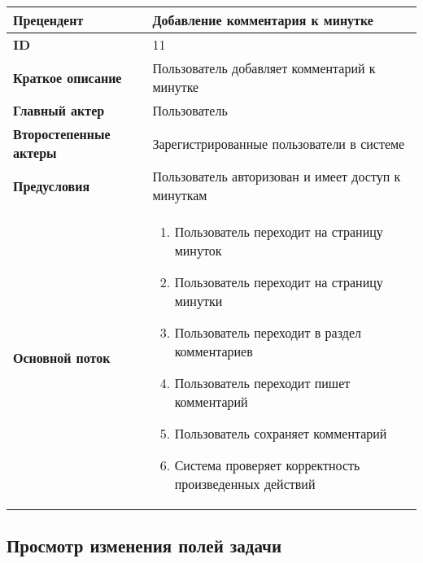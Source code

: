 \documentclass[14pt,a4paper]{extarticle}
\begin{document}
\begin{tabular}{|l|p{9cm}|}
	\hline
	\textbf{Прецендент}            & Добавление комментария к минутке                           \\
	\hline
	\textbf{ID}                    & 11                                                         \\
	\hline
	\textbf{Краткое описание}      & Пользователь добавляет комментарий к минутке               \\
	\hline
	\textbf{Главный актер}         & Пользователь                                               \\
	\hline
	\textbf{Второстепенные актеры} & Зарегистрированные пользователи в системе                  \\
	\hline
	\textbf{Предусловия}           & Пользователь авторизован и имеет доступ к минуткам         \\
	\hline
	\textbf{Основной поток}        & \begin{enumerate}
		                                 \item Пользователь переходит на страницу минуток
		                                 \item Пользователь переходит на страницу минутки
		                                 \item Пользователь переходит в раздел комментариев
		                                 \item Пользователь переходит пишет комментарий
		                                 \item Пользователь сохраняет комментарий
		                                 \item Система проверяет корректность произведенных действий
	                                 \end{enumerate} \\
	\hline
\end{tabular}

\subsection{Просмотр изменения полей задачи}
\end{document}
